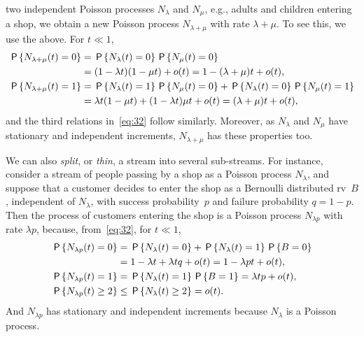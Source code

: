 \documentclass[queueing-book.tex]{subfiles}
\begin{document}
 two independent Poisson processes $N_{\lambda}$ and $N_{\mu}$, e.g., adults and children entering a shop, we obtain a new Poisson process $N_{\lambda +\mu}$ with rate $\lambda + \mu$. To see this, we use the above. For $t\ll 1$,
\begin{align*}
\P{N_{\lambda+\mu}( t) = 0} &= \P{N_{\lambda}( t) = 0} \P{N_{\mu}( t) = 0} \\
  &= (1-\lambda t)(1-\mu t) + o(t) = 1 - (\lambda + \mu)t + o(t), \\
\P{N_{\lambda+\mu}( t) = 1} &= \P{N_{\lambda}( t) = 1} \P{N_{\mu}( t) = 0}  + \P{N_{\lambda}( t) = 0} \P{N_{\mu}( t) = 1}\\
  &= \lambda t (1-\mu t) + (1-\lambda t)\mu t + o(t) = (\lambda + \mu) t + o(t),
\end{align*}
and the third  relations in~\cref{eq:32} follow similarly.
Moreover, as $N_{\lambda}$ and $N_{\mu}$ have stationary and independent increments, $N_{\lambda +\mu}$ has these properties too.

We can also \emph{split}, or \emph{thin}, a stream into several sub-streams.
For instance, consider a stream of people passing by a shop as a Poisson process $N_\lambda$, and suppose that a customer decides to enter the shop as a Bernoulli distributed rv~$B$, independent of $N_{\lambda}$, with success probability~$p$ and failure probability $q=1-p$.
Then the process of customers entering the shop is a Poisson process $N_{\lambda p}$ with rate $\lambda p$, because, from~\cref{eq:32}, for $t\ll 1$,
\begin{align*}
  \P{N_{\lambda p}(t) = 0 } &= \P{N_{\lambda}(t) = 0} +\P{N_{\lambda}(t) = 1}\P{B=0} \\
  &= 1- \lambda t + \lambda t q  + o(t) = 1 - \lambda p t + o(t),\\
  \P{N_{\lambda p}(t) = 1 } &= \P{N_{\lambda}(t) = 1}\P{B=1} = \lambda t p + o(t),\\
  \P{N_{\lambda p}(t) \geq 2 } &\leq  \P{N_{\lambda}(t) \geq 2} = o(t).
\end{align*}
And $N_{\lambda p}$ has stationary and independent increments because $N_{\lambda}$ is a Poisson process.
\end{document}
